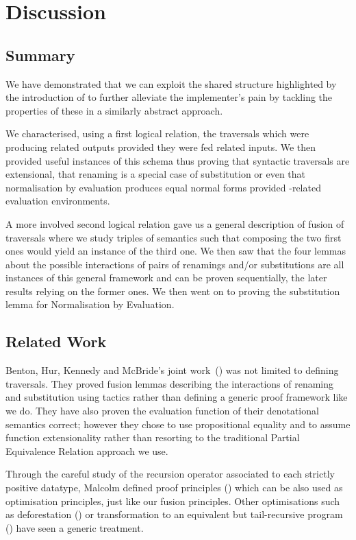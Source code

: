\chapter{Discussion}

\section{Summary}

We have demonstrated that we can exploit the shared structure highlighted by the
introduction of  to further alleviate the implementer's pain by
tackling the properties of these  in a similarly abstract approach.

We characterised, using a first logical relation, the traversals which were
producing related outputs provided they were fed related inputs. We then provided
useful instances of this schema thus proving that syntactic traversals are
extensional, that renaming is a special case of substitution or even that
normalisation by evaluation produces equal normal forms provided -related
evaluation environments.

A more involved second logical relation gave us a general description of fusion
of traversals where we study triples of semantics such that composing the two
first ones would yield an instance of the third one. We then saw that the four
lemmas about the possible interactions of pairs of renamings and/or substitutions
are all instances of this general framework and can be proven sequentially, the
later results relying on the former ones. We then went on to proving the
substitution lemma for Normalisation by Evaluation.

\section{Related Work}

Benton, Hur, Kennedy and McBride's joint work~(\citeyear{benton2012strongly}) was not
limited to defining traversals. They proved fusion lemmas describing the interactions
of renaming and substitution using tactics rather than defining a generic proof framework
like we do. They have also proven the evaluation function of their denotational semantics
correct; however they chose to use propositional equality and to assume function
extensionality rather than resorting to the traditional Partial Equivalence Relation
approach we use.

Through the careful study of the recursion operator associated to each strictly positive
datatype, Malcolm defined proof principles (\citeyear{DBLP:journals/scp/Malcolm90}) which can
be also used as optimisation principles, just like our fusion principles. Other
optimisations such as deforestation (\cite{wadler1990deforestation}) or transformation
to an equivalent but tail-recursive program (\cite{TomeCortinas:2018:AAM:3240719.3241787})
have seen a generic treatment.


